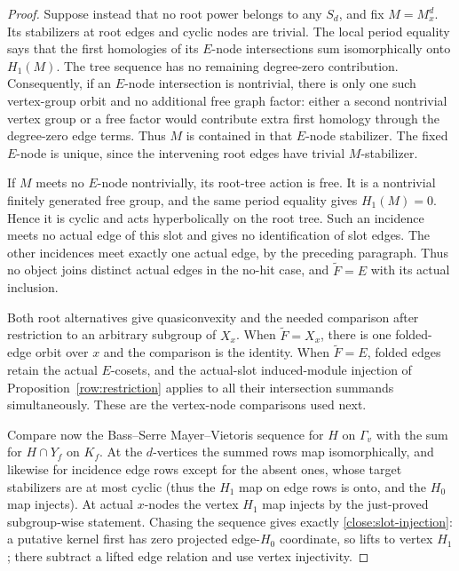 \begin{proof}
Suppose instead that no root power belongs to any $S_d$, and fix
$M=M_x^d$. Its stabilizers at root edges and cyclic nodes are
trivial. The local period equality says that the first homologies
of its $E$-node intersections sum isomorphically onto $H_1(M)$.
The tree sequence has no remaining degree-zero contribution.
Consequently, if an $E$-node intersection is nontrivial, there is
only one such vertex-group orbit and no additional free graph
factor: either a second nontrivial vertex group or a free factor
would contribute extra first homology through the degree-zero
edge terms. Thus $M$ is contained in that $E$-node stabilizer.
The fixed $E$-node is unique, since the intervening root edges have
trivial $M$-stabilizer.

If $M$ meets no $E$-node nontrivially, its root-tree action is free.
It is a nontrivial finitely generated free group, and the same
period equality gives $H_1(M)=0$. Hence it is cyclic and acts
hyperbolically on the root tree. Such an incidence meets no actual
edge of this slot and gives no identification of slot edges.
The other incidences meet exactly one actual edge, by the preceding
paragraph. Thus no object joins distinct actual edges in the
no-hit case, and $\widetilde F=E$ with its actual inclusion.

Both root alternatives give quasiconvexity and the needed comparison
after restriction to an arbitrary subgroup of $X_x$. When
$\widetilde F=X_x$, there is one folded-edge orbit over $x$ and the
comparison is the identity. When $\widetilde F=E$, folded edges
retain the actual $E$-cosets, and the actual-slot induced-module
injection of Proposition~\ref{row:restriction} applies to all their
intersection summands simultaneously. These are the vertex-node
comparisons used next.

Compare now the Bass--Serre Mayer--Vietoris sequence for \(H\) on \(\Gamma_v\) with the sum for \(H\cap Y_f\) on \(K_f\). At the \(d\)-vertices the summed rows map isomorphically, and likewise for incidence edge rows except for the absent ones, whose target stabilizers are at most cyclic (thus the \(H_1\) map on edge rows is onto, and the \(H_0\) map injects). At actual \(x\)-nodes the vertex \(H_1\) map injects by the just-proved subgroup-wise statement. Chasing the sequence gives exactly \eqref{close:slot-injection}: a putative kernel first has zero projected edge-\(H_0\) coordinate, so lifts to vertex \(H_1\); there subtract a lifted edge relation and use vertex injectivity.
\end{proof}

